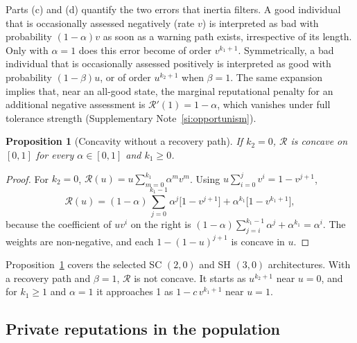 \documentclass[fleqn,10pt]{wlscirep}
\newcommand{\Rmap}{\mathscr{R}}            %
\theoremstyle{plain}
\newtheorem{proposition}[lemma]{Proposition}
\begin{document}
Parts (c) and (d) quantify the two errors that inertia filters. A good individual that is occasionally assessed negatively (rate $v$) is interpreted as bad with probability $(1-\alpha)v$ as soon as a warning path exists, irrespective of its length. Only with $\alpha=1$ does this error become of order $v^{k_1+1}$. Symmetrically, a bad individual that is occasionally assessed positively is interpreted as good with probability $(1-\beta)u$, or of order $u^{k_2+1}$ when $\beta=1$. The same expansion implies that, near an all-good state, the marginal reputational penalty for an additional negative assessment is $\Rmap'(1)=1-\alpha$, which vanishes under full tolerance strength (Supplementary Note~\ref{si:opportunism}).

\begin{proposition}[Concavity without a recovery path]\label{prop:concave}
If $k_2=0$, $\Rmap$ is concave on $[0,1]$ for every $\alpha\in[0,1]$ and $k_1\geq0$.
\end{proposition}
\begin{proof}
For $k_2=0$, $\Rmap(u)=u\sum_{m=0}^{k_1}\alpha^mv^m$. Using $u\sum_{i=0}^{j}v^i=1-v^{j+1}$,
\begin{equation*}
\Rmap(u)=(1-\alpha)\sum_{j=0}^{k_1-1}\alpha^j\bigl[1-v^{j+1}\bigr]+\alpha^{k_1}\bigl[1-v^{k_1+1}\bigr],
\end{equation*}
because the coefficient of $uv^i$ on the right is $(1-\alpha)\sum_{j=i}^{k_1-1}\alpha^j+\alpha^{k_1}=\alpha^i$. The weights are non-negative, and each $1-(1-u)^{j+1}$ is concave in $u$.
\end{proof}

Proposition~\ref{prop:concave} covers the selected SC $(2,0)$ and SH $(3,0)$ architectures. With a recovery path and $\beta=1$, $\Rmap$ is not concave. It starts as $u^{k_2+1}$ near $u=0$, and for $k_1\geq1$ and $\alpha=1$ it approaches 1 as $1-c\,v^{k_1+1}$ near $u=1$.

\subsection{Private reputations in the population}
\label{si:population}
\end{document}
